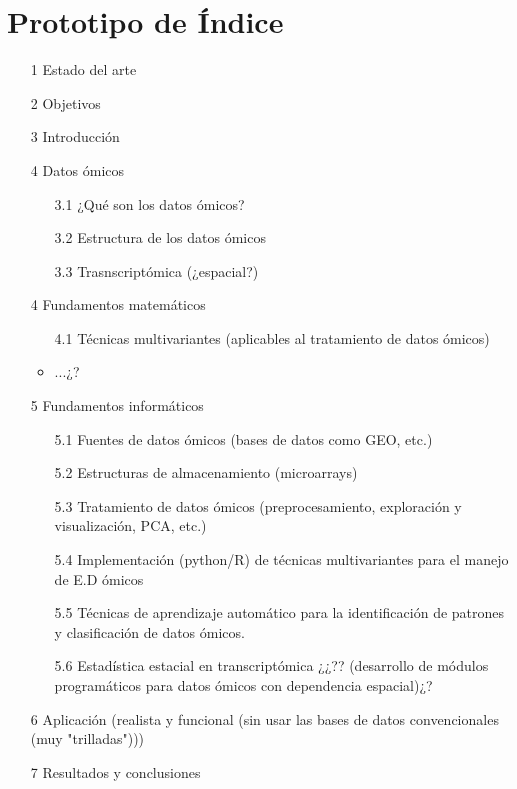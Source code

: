 \documentclass{article}
\begin{document}
\section*{Prototipo de Índice}

\begin{itemize}
    \item[1] Estado del arte
    \item[2] Objetivos
    \item[3] Introducción
    \item[4] Datos ómicos
    \begin{itemize}
        \item[3.1] ¿Qué son los datos ómicos?
        \item[3.2] Estructura de los datos ómicos
        \item[3.3] Trasnscriptómica (¿espacial?)
    \end{itemize}
    \item[4] Fundamentos matemáticos
    \begin{itemize}
        \item[4.1] Técnicas multivariantes (aplicables al tratamiento de datos ómicos)
        \item ...¿?
    \end{itemize}
    \item[5] Fundamentos informáticos
    \begin{itemize}
        \item[5.1] Fuentes de datos ómicos (bases de datos como GEO, etc.)
        \item[5.2] Estructuras de almacenamiento (microarrays)
        \item[5.3] Tratamiento de datos ómicos (preprocesamiento, exploración y visualización, PCA, etc.)
        \item[5.4] Implementación (python/R) de técnicas multivariantes para el manejo de E.D ómicos
        \item[5.5] Técnicas de aprendizaje automático para la identificación de patrones y clasificación de datos ómicos.
        \item[5.6] Estadística estacial en transcriptómica ¿¿?? (desarrollo de módulos programáticos para datos ómicos con
        dependencia espacial)¿?
    \end{itemize}
    \item[6] Aplicación (realista y funcional (sin usar las bases de datos convencionales (muy "trilladas")))
    \item[7] Resultados y conclusiones
\end{itemize}
\end{document}
